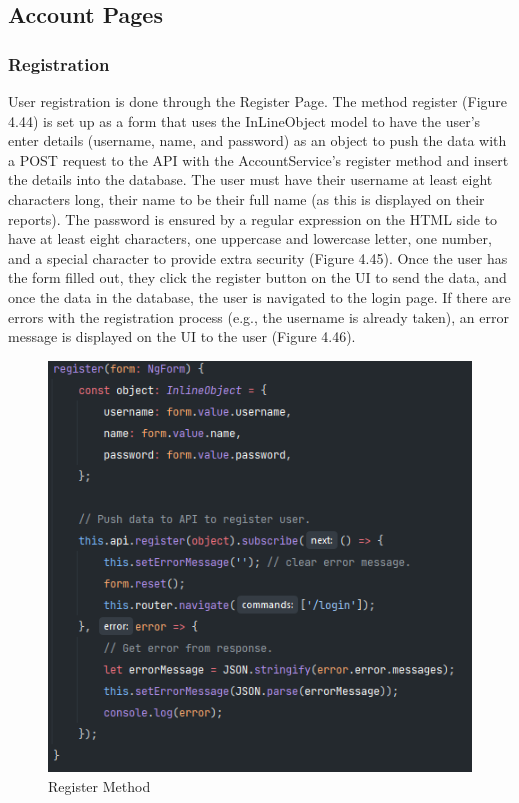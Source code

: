 \subsection{Account Pages}

\subsubsection{Registration}
User registration is done through the Register Page. The method register (Figure 4.44) is set up as a form that uses the InLineObject model to have the user's enter details (username, name, and password) as an object to push the data with a POST request to the API with the AccountService's register method and insert the details into the database. The user must have their username at least eight characters long, their name to be their full name (as this is displayed on their reports). The password is ensured by a regular expression on the HTML side to have at least eight characters, one uppercase and lowercase letter, one number, and a special character to provide extra security (Figure 4.45). Once the user has the form filled out, they click the register button on the UI to send the data, and once the data in the database, the user is navigated to the login page. If there are errors with the registration process (e.g., the username is already taken), an error message is displayed on the UI to the user (Figure 4.46).

\begin{figure}[H]
    \caption{Register Method}
    \label{image:registerMethod}
    \centering
    \includegraphics[width=1.0\textwidth]{images/repota/account_pages/register.png}
\end{figure}

